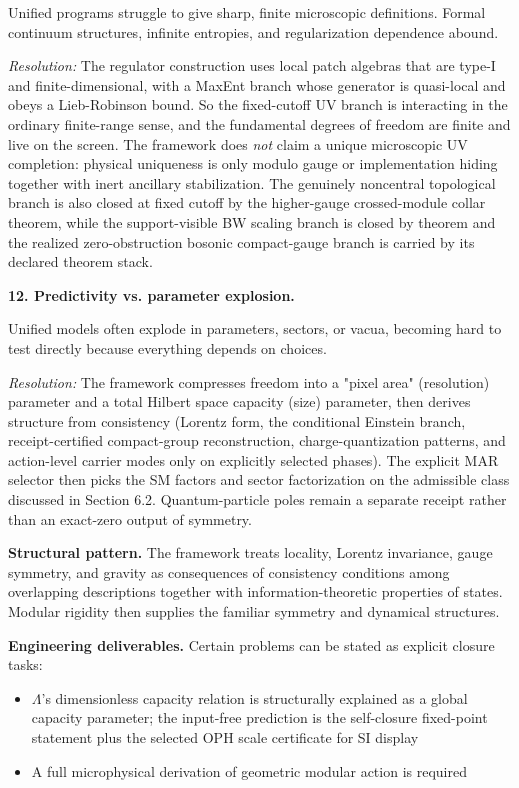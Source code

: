 Unified programs struggle to give sharp, finite microscopic definitions. Formal continuum structures, infinite entropies, and regularization dependence abound.

\emph{Resolution:} The regulator construction uses local patch algebras that are type-I and finite-dimensional, with a MaxEnt branch whose generator is quasi-local and obeys a Lieb-Robinson bound. So the fixed-cutoff UV branch is interacting in the ordinary finite-range sense, and the fundamental degrees of freedom are finite and live on the screen. The framework does \emph{not} claim a unique microscopic UV completion: physical uniqueness is only modulo gauge or implementation hiding together with inert ancillary stabilization. The genuinely noncentral topological branch is also closed at fixed cutoff by the higher-gauge crossed-module collar theorem, while the support-visible BW scaling branch is closed by theorem and the realized zero-obstruction bosonic compact-gauge branch is carried by its declared theorem stack.

\textbf{12. Predictivity vs. parameter explosion.}

Unified models often explode in parameters, sectors, or vacua, becoming hard to test directly because everything depends on choices.

\emph{Resolution:} The framework compresses freedom into a "pixel area" (resolution) parameter and a total Hilbert space capacity (size) parameter, then derives structure from consistency (Lorentz form, the conditional Einstein branch, receipt-certified compact-group reconstruction, charge-quantization patterns, and action-level carrier modes only on explicitly selected phases). The explicit MAR selector then picks the SM factors and sector factorization on the admissible class discussed in Section 6.2. Quantum-particle poles remain a separate receipt rather than an exact-zero output of symmetry.

\textbf{Structural pattern.} The framework treats locality, Lorentz invariance, gauge symmetry, and
gravity as consequences of consistency conditions among overlapping descriptions together with
information-theoretic properties of states. Modular rigidity then supplies the familiar symmetry
and dynamical structures.

\textbf{Engineering deliverables.} Certain problems can be stated as explicit closure tasks:

\begin{itemize}
\tightlist
\item
  \(\Lambda\)'s dimensionless capacity relation is structurally explained as a global capacity
  parameter; the input-free prediction is the self-closure fixed-point statement plus the selected
  OPH scale certificate for SI display
\item
  A full microphysical derivation of geometric modular action is required
\end{itemize}

